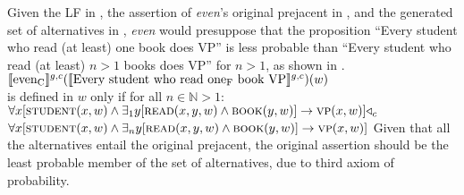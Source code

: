 \xe
Given the LF in , the assertion of \textit{even}'s original prejacent in , and the generated set of alternatives in , \textit{even} would presuppose that the proposition  \enquote{Every student who read (at least) one book does VP} is less probable than \enquote{Every student who read (at least) $n>1$ books does VP} for $n>1$, as shown in .
\ex{}
$\intension[g,c]{even\textsubscript{C}}(\intension[g,c]{Every student who read one\textsubscript{F} book VP})(w)$\\is defined in $w$ only if for all $n\in\mathbb{N}>1$:\\$\forall{x}[\predicate{student}(x,w)\land\exists_1{y}[\predicate{read}(x,y,w)\land\predicate{book}(y,w)]\rightarrow\predicate{vp}(x,w)]\lprob_c$\\\emptyfill$\forall{x}[\predicate{student}(x,w)\land\exists_n{y}[\predicate{read}(x,y,w)\land\predicate{book}(y,w)]\rightarrow\predicate{vp}(x,w)]$
\xe
Given that all the alternatives entail the original prejacent, the original assertion should be the least probable member of the set of alternatives, due to  third axiom of probability.

